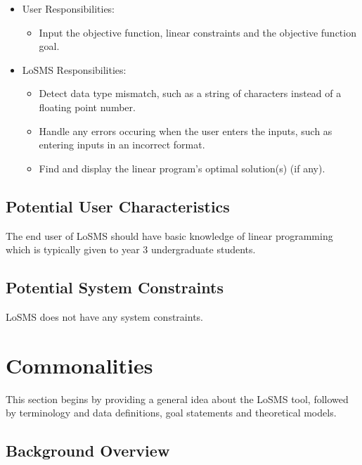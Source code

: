 \documentclass[12pt]{article}
\newcommand{\famname}{LoSMS} %
\begin{document}
\begin{itemize}
	\item User Responsibilities:
	\begin{itemize}
		\item Input the objective function, linear constraints and the 
		objective function goal.
	\end{itemize}
	\item \famname{} Responsibilities:
	\begin{itemize}
		\item Detect data type mismatch, such as a string of characters instead 
		of a floating point number.
		
		\item Handle any errors occuring when the user enters the inputs, such 
		as entering inputs in an incorrect format.
		
		\item Find and display the linear program's optimal solution(s) (if 
		any).
	\end{itemize}
\end{itemize}

\subsection{Potential User Characteristics} \label{SecUserCharacteristics}

The end user of \famname{} should have basic knowledge of linear programming  
which is typically given to year 3 undergraduate students.

\subsection{Potential System Constraints}

\famname{} does not have any system constraints.

\section{Commonalities} \label{Sec_Commonalities}

This section begins by providing a general idea about the \famname{} tool, 
followed by terminology and data definitions, goal statements and theoretical 
models.

\subsection{Background Overview} \label{Sec_Background}
\end{document}
